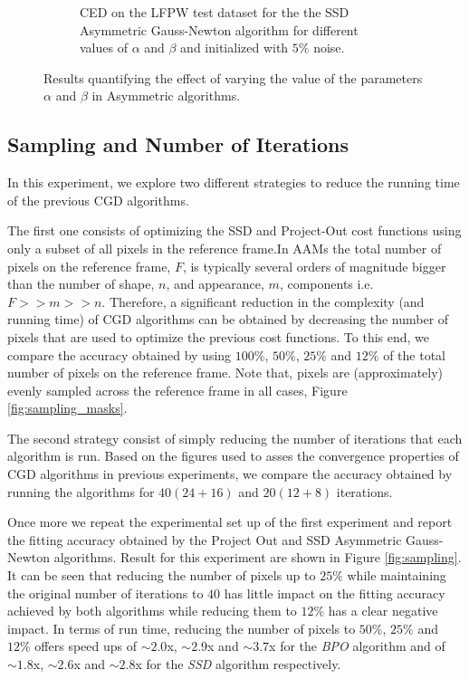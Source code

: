 \begin{figure}[h!]
\begin{subfigure}{0.48\textwidth}
	    \caption{CED on the LFPW test dataset for the the SSD Asymmetric Gauss-Newton algorithm for different values of $\alpha$ and $\beta$ and initialized with $5\%$ noise.}
	    \label{fig:ced_ssd_asy_gn_5}
	\end{subfigure}
	\caption{Results quantifying the effect of varying the value of the parameters $\alpha$ and $\beta$ in Asymmetric algorithms.}
	\label{fig:alpha}
\end{figure}



\subsection{Sampling and Number of Iterations}

In this experiment, we explore two different strategies to reduce the running time of the previous CGD algorithms. 

The first one consists of optimizing the SSD and Project-Out cost functions using only a subset of all pixels in the reference frame.In AAMs the total number of pixels on the reference frame, $F$, is typically several orders of magnitude bigger than the number of shape, $n$, and appearance, $m$, components i.e. $F>>m>>n$. Therefore, a significant reduction in the complexity (and running time) of CGD algorithms can be obtained by decreasing the number of pixels that are used to optimize the previous cost functions. To this end, we compare the accuracy obtained by using $100\%$, $50\%$, $25\%$ and $12\%$ of the total number of pixels on the reference frame. Note that, pixels are (approximately) evenly sampled across the reference frame in all cases, Figure \ref{fig:sampling_masks}.

The second strategy consist of simply reducing the number of iterations that each algorithm is run. Based on the figures used to asses the convergence properties of CGD algorithms in previous experiments, we compare the accuracy obtained by running the algorithms for $40 (24 + 16)$ and $20 (12 + 8)$ iterations.

Once more we repeat the experimental set up of the first experiment and report the fitting accuracy obtained by the Project Out and SSD Asymmetric Gauss-Newton algorithms. Result for this experiment are shown in Figure \ref{fig:sampling}. It can be seen that reducing the number of pixels up to $25\%$ while maintaining the original number of iterations to $40$ has little impact on the fitting accuracy achieved by both algorithms while reducing them to $12\%$ has a clear negative impact. In terms of run time, reducing the number of pixels to $50\%$, $25\%$ and $12\%$ offers speed ups of $\sim2.0$x, $\sim2.9$x and $\sim3.7$x for the \emph{BPO} algorithm and of $\sim1.8$x, $\sim2.6$x and $\sim2.8$x for the \emph{SSD} algorithm respectively. 

